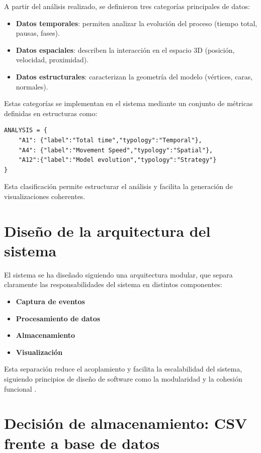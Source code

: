 A partir del análisis realizado, se definieron tres categorías principales de datos:

\begin{itemize}
    \item \textbf{Datos temporales}: permiten analizar la evolución del proceso (tiempo total, pausas, fases).
    \item \textbf{Datos espaciales}: describen la interacción en el espacio 3D (posición, velocidad, proximidad).
    \item \textbf{Datos estructurales}: caracterizan la geometría del modelo (vértices, caras, normales).
\end{itemize}

Estas categorías se implementan en el sistema mediante un conjunto de métricas definidas en estructuras como:

\begin{verbatim}
ANALYSIS = {
    "A1": {"label":"Total time","typology":"Temporal"},
    "A4": {"label":"Movement Speed","typology":"Spatial"},
    "A12":{"label":"Model evolution","typology":"Strategy"}
}
\end{verbatim}

Esta clasificación permite estructurar el análisis y facilita la generación de visualizaciones coherentes.

\section{Diseño de la arquitectura del sistema}

El sistema se ha diseñado siguiendo una arquitectura modular, que separa claramente las responsabilidades del sistema en distintos componentes:

\begin{itemize}
    \item \textbf{Captura de eventos}
    \item \textbf{Procesamiento de datos}
    \item \textbf{Almacenamiento}
    \item \textbf{Visualización}
\end{itemize}

Esta separación reduce el acoplamiento y facilita la escalabilidad del sistema, siguiendo principios de diseño de software como la modularidad y la cohesión funcional \cite{gamma1994}.

\section{Decisión de almacenamiento: CSV frente a base de datos}

